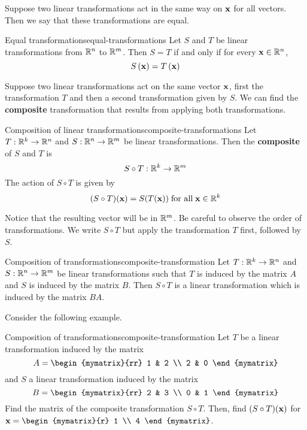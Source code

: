 Suppose two linear transformations act in the same way on $\mbox{\bf x}$ for all vectors. Then we say that these transformations are equal.

\begin{definition}{Equal transformations}{equal-transformations}
Let $S$ and $T$ be linear transformations from $\mathbb{R}^n$ to $\mathbb{R}^m$. Then $S = T$ if and only if for every $\mbox{\bf x} \in \mathbb{R}^n$, 
\[
S \left(\mbox{\bf x} \right) = T \left(\mbox{\bf x} \right)
\]
\end{definition}

Suppose two linear transformations act on the same vector $\mbox{\bf x}$, first the transformation $T$ and then a second transformation given by $S$. We can find the \textbf{composite} transformation that results from applying both transformations.

\begin{definition}{Composition of linear transformations}{composite-transformations}
Let $T: \mathbb{R}^k \to \mathbb{R}^n$ and $S: \mathbb{R}^n \to \mathbb{R}^m$ be linear transformations. Then the \textbf{composite} of $S$ and $T$ is 
\[
S \circ T: \mathbb{R}^k \to \mathbb{R}^m
\]
The action of $S \circ T$ is given by 
\[
(S \circ T) (\mbox{\bf x}) = S(T(\mbox{\bf x})) \; \mbox{for all} \; \mbox{\bf x} \in \mathbb{R}^k
\]
\end{definition}

Notice that the resulting vector will be in $\mathbb{R}^m$. Be careful to observe the order of transformations. We write $S \circ T$ but apply the transformation $T$ first, followed by $S$. 

\begin{theorem}{Composition of transformations}{composite-transformation}
Let $T: \mathbb{R}^k \to \mathbb{R}^n$ and $S: \mathbb{R}^n \to \mathbb{R}^m$ be linear transformations such that $T$ is induced by the matrix $A$ and $S$ is induced by the matrix $B$. Then $S \circ T$ is a linear transformation which is induced by the matrix $BA$.
\end{theorem}

Consider the following example. 

\begin{example}{Composition of transformations}{composite-transformation}
Let $T$ be a linear transformation induced by the matrix 
\[
A = 
\begin{mymatrix}{rr}
1 & 2 \\
2 & 0 
\end{mymatrix}
\]
and $S$ a linear transformation induced by the matrix
\[
B = 
\begin{mymatrix}{rr}
2 & 3 \\
0 & 1
\end{mymatrix}
\]
Find the matrix of the composite transformation $S \circ T$. Then, find $(S \circ T)(\mbox{\bf x})$ for $\vect{x} = \begin{mymatrix}{r}
1 \\
4 
\end{mymatrix}$.
\end{example}

